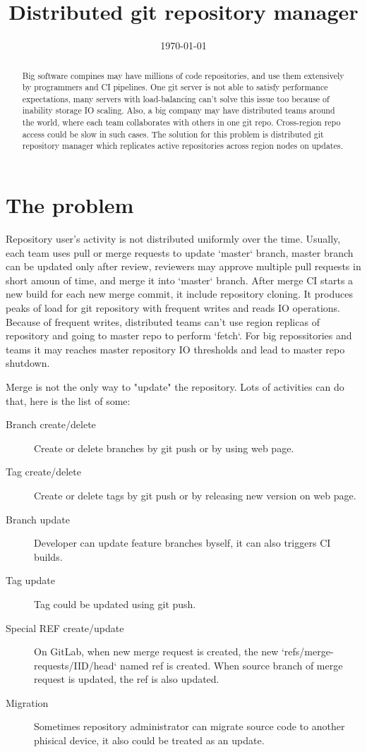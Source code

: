 \documentclass[12pt,oneside]{article}
\date{\small\today}
\title{%
  Distributed git repository manager\\
  \colorbox{firebrick}{\small\sffamily\color{white}{White Paper}}}
\begin{document}
\raggedbottom

\maketitle
\begin{abstract}
Big software compines may have millions of code repositories,
and use them extensively by programmers and CI pipelines.
One git server is not able to satisfy performance expectations,
many servers with load-balancing can't solve this issue too because
of inability storage IO scaling.
Also, a big company may have distributed teams around the world,
where each team collaborates with others in one git repo.
Cross-region repo access could be slow in such cases.
The solution for this problem is distributed git repository manager
which replicates active repositories across region nodes on updates.
\end{abstract}


\section{The problem}

Repository user's activity is not distributed uniformly over the time.
Usually, each team uses pull or merge requests to update `master` branch,
master branch can be updated only after review, reviewers may approve multiple
pull requests in short amoun of time, and merge it into `master` branch.
After merge CI starts a new build for each new merge commit, it include repository cloning.
It produces peaks of load for git repository with frequent writes and reads IO operations.
Because of frequent writes, distributed teams can't use region replicas of repository
and going to master repo to perform `fetch`. For big repossitories and teams it may
reaches master repository IO thresholds and lead to master repo shutdown.

Merge is not the only way to "update" the repository. Lots of activities can do that,
here is the list of some:
\begin{description}
  \item[Branch create/delete]
    Create or delete branches by git push or by using web page.
  \item[Tag create/delete]
    Create or delete tags by git push or by releasing new version on web page.
  \item[Branch update]
    Developer can update feature branches byself, it can also triggers CI builds.
  \item[Tag update]
    Tag could be updated using git push.
  \item[Special REF create/update]
    On GitLab, when new merge request is created, the new `refs/merge-requests/IID/head` named ref
    is created. When source branch of merge request is updated, the ref is also updated.
  \item[Migration]
    Sometimes repository administrator can migrate source code to another phisical device, it also
    could be treated as an update.
\end{description}
\end{document}

